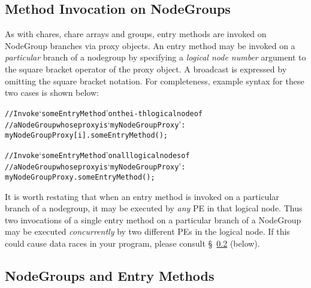 

\subsection{Method Invocation on NodeGroups}

As with chares, chare arrays and groups, entry methods are invoked on
NodeGroup branches via proxy objects. 
An entry method may be invoked on a {\em particular} branch of a
nodegroup by specifying a {\em logical node number} argument
to the square bracket operator of the proxy object. A broadcast is expressed
by omitting the square bracket notation. For completeness, example syntax for these
two cases is shown below:

\begin{alltt}
 // Invoke `someEntryMethod' on the i-th logical node of
 // a NodeGroup whose proxy is `myNodeGroupProxy':
 myNodeGroupProxy[i].someEntryMethod();

 // Invoke `someEntryMethod' on all logical nodes of
 // a NodeGroup whose proxy is `myNodeGroupProxy':
 myNodeGroupProxy.someEntryMethod();
\end{alltt}

It is worth restating that when an entry method is
invoked on a particular branch of a nodegroup,
it may be executed by {\em any} PE in that logical node. Thus two invocations of
a single entry method on a particular branch of a
NodeGroup may be executed {\em concurrently} by two
different PEs in the logical node. If this could cause data races in your
program, please consult \S~\ref{sec:nodegroups/exclusive} (below).


\subsection{NodeGroups and  Entry Methods}
\label{sec:nodegroups/exclusive}

